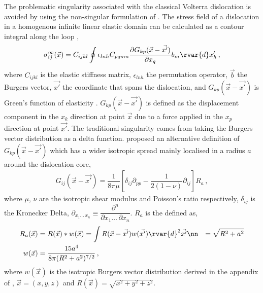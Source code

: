 The problematic singularity associated with the classical Volterra dislocation is avoided by using the non-singular formulation of \citet{a_non-singular_continuum_theory_of_dislocations}. The stress field of a dislocation in a homogenous infinite linear elastic domain can be calculated as a contour integral along the loop \cite{eigenstrain},
\begin{align}\label{eq:field_stress}
  \sigma_{ij}^{\infty}(\vec{x}) = C_{ijkl} \oint \epsilon_{lnh} C_{pqmn} \dfrac{\partial G_{kp}(\vec{x} - \vec{x'})}{\partial x_{q}} b_{m} \rvar{d}x'_{h}\,,
\end{align}
where $ C_{ijkl} $ is the elastic stiffness matrix, $ \epsilon_{lnh} $ the permutation operator, $\vec{b}$ the Burgers vector, $ \vec{x'} $ the coordinate that spans the dislocation, and $ G_{kp}(\vec{x} - \vec{x'}) $ is Green's function of elasticity \cite{eigenstrain}. $ G_{kp}(\vec{x} - \vec{x'}) $ is defined as the displacement component in the $ x_{k} $ direction at point $ \vec{x} $ due to a force applied in the $ x_{p} $ direction at point $ \vec{x'} $. The traditional singularity comes from taking the Burgers vector distribution as a delta function. \citet{a_non-singular_continuum_theory_of_dislocations} proposed an alternative definition of $ G_{kp}(\vec{x} - \vec{x'}) $ which has a wider isotropic spread mainly localised in a radius $ a $ around the dislocation core,
\begin{align}\label{eq:elastic_green_func}
  G_{ij}(\vec{x} - \vec{x'}) = \dfrac{1}{8\pi \mu}\left[ \delta_{ij} \partial_{pp} - \dfrac{1}{2(1-\nu)} \partial_{ij} \right] R_{a}\,,
\end{align}
where $ \mu $, $ \nu $ are the isotropic shear modulus and Poisson's ratio respectively, $ \delta_{ij} $ is the Kronecker Delta, $ \partial_{x_{1} \ldots\, x_{n}} \equiv \dfrac{\partial^{n}}{\partial x_{1} \ldots\, \partial x_{n}}$. $ R_{a} $ is the defined as,
\begin{subequations}
  \begin{align}\label{eq:ra}
    R_{a}(\vec{x}) & = R(\vec{x}) * w(\vec{x}) = \int R(\vec{x} - \vec{x'}) w(\vec{x'}) \rvar{d}^{3}\vec{x'}\nn
                   & = \sqrt{R^{2} + a^{2}}                                                                     \\
    w(\vec{x})     & = \dfrac{15 a^{4}}{8\pi (R^{2} + a^{2})^{7/2}}\,,
  \end{align}
\end{subequations}
where $ w(\vec{x}) $ is the isotropic Burgers vector distribution derived in the appendix of \cite{a_non-singular_continuum_theory_of_dislocations}, $ \vec{x} = (x, y, z) $ and $ R(\vec{x}) = \sqrt{x^{2} + y^{2} + z^{2}} $.

